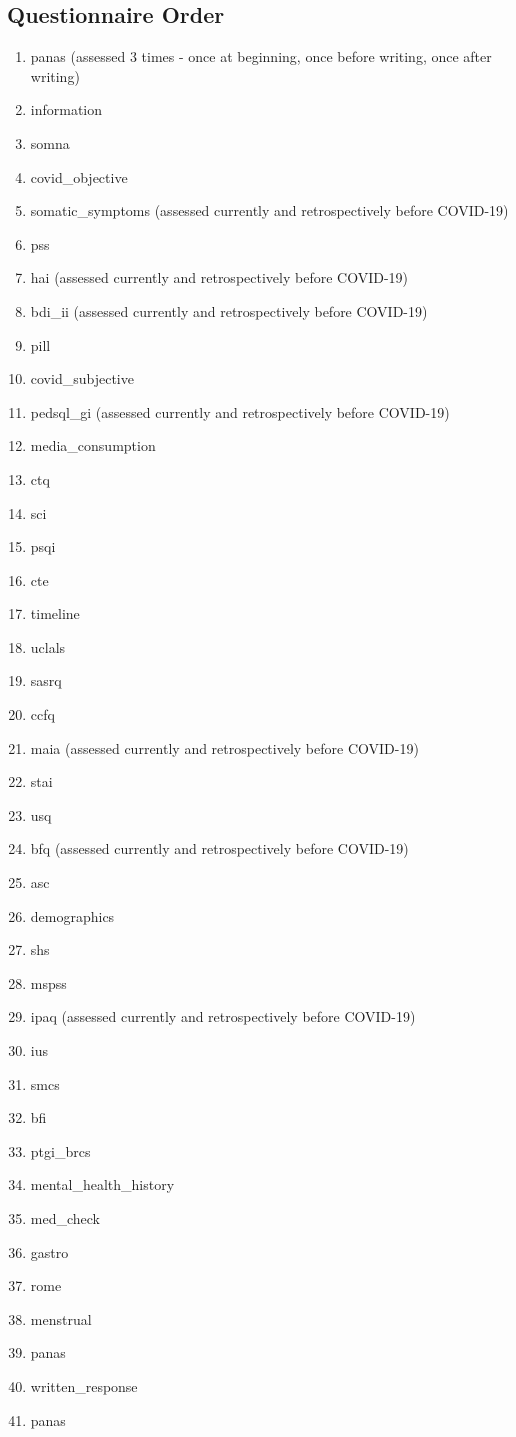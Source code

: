 \documentclass[]{book}
\providecommand{\tightlist}{%
  \setlength{\itemsep}{0pt}\setlength{\parskip}{0pt}}
\begin{document}
\hypertarget{questionnaire-order}{%
\subsection{Questionnaire Order}\label{questionnaire-order}}

\begin{enumerate}
\def\labelenumi{\arabic{enumi}.}
\tightlist
\item
  panas (assessed 3 times - once at beginning, once before writing, once after writing)
\item
  information
\item
  somna
\item
  covid\_objective
\item
  somatic\_symptoms (assessed currently and retrospectively before COVID-19)
\item
  pss
\item
  hai (assessed currently and retrospectively before COVID-19)
\item
  bdi\_ii (assessed currently and retrospectively before COVID-19)
\item
  pill
\item
  covid\_subjective
\item
  pedsql\_gi (assessed currently and retrospectively before COVID-19)
\item
  media\_consumption
\item
  ctq
\item
  sci
\item
  psqi
\item
  cte
\item
  timeline
\item
  uclals
\item
  sasrq
\item
  ccfq
\item
  maia (assessed currently and retrospectively before COVID-19)
\item
  stai
\item
  usq
\item
  bfq (assessed currently and retrospectively before COVID-19)
\item
  asc
\item
  demographics
\item
  shs
\item
  mspss
\item
  ipaq (assessed currently and retrospectively before COVID-19)
\item
  ius
\item
  smcs
\item
  bfi
\item
  ptgi\_brcs
\item
  mental\_health\_history
\item
  med\_check
\item
  gastro
\item
  rome
\item
  menstrual
\item
  panas
\item
  written\_response
\item
  panas
\end{enumerate}
\end{document}
